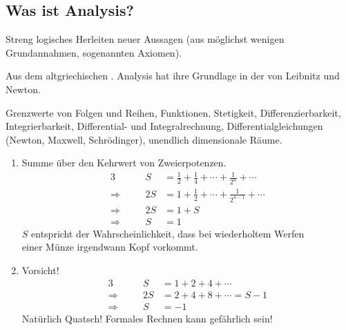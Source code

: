 \documentclass[../ana1.tex]{subfiles}
\begin{document}
\setcounter{section}{0}

\begin{prosa}

\section{Was ist Analysis?}

\begin{description}[style=nextline]
	\item[Mathematik]
		Streng logisches Herleiten neuer Aussagen (aus möglichst wenigen\\ Grundannahmen, sogenannten Axiomen).
	\item[Analysis]
		Aus dem altgriechischen . Analysis hat ihre Grundlage in der  \: von Leibnitz und Newton.
	\item[Zentrale Begriffe]
		Grenzwerte von Folgen und Reihen, Funktionen, Stetigkeit, Differenzierbarkeit, Integrierbarkeit, Differential- und Integralrechnung, Differentialgleichungen
		(Newton, Maxwell, Schrödinger), unendlich dimensionale Räume.
\end{description}

\begin{bspe}\leavevmode
	\begin{enumerate}[(1)]
		\item Summe über den Kehrwert von Zweierpotenzen.
			\begin{alignat*}{3}
							   &&             S &= \frac{1}{2} + \frac{1}{4} + \cdots + \frac{1}{2^{n}} + \cdots \\
				\Longrightarrow&\quad& 		 2S &= 1 + \frac{1}{2} + \cdots + \frac{1}{2^{n-1}} + \cdots \\
				\Longrightarrow&\quad& 	     2S &= 1 + S \\
				\Longrightarrow&&             S &= 1
			\end{alignat*}
			\(S\) entspricht der Wahrscheinlichkeit, dass bei wiederholtem Werfen \\
			einer Münze irgendwann Kopf vorkommt.\\
		\item Vorsicht!
			\begin{alignat*}{3}
							   &&       S &= 1 + 2 + 4 + \cdots\\
				\Longrightarrow&\quad& 2S &= 2 + 4 + 8 + \cdots = S - 1\\
				\Longrightarrow&\quad&  S &= \minus 1
			\end{alignat*}
			Natürlich Quatsch! Formales Rechnen kann gefährlich sein!
	\end{enumerate}
\end{bspe}


\end{prosa}
\end{document}
